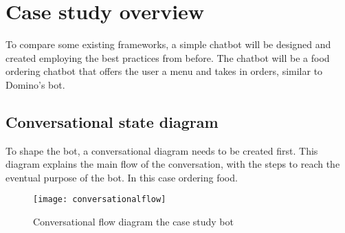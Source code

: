 \chapter{Case study overview}

To compare some existing frameworks, a simple chatbot will be designed and created employing the best practices from before. The chatbot will be a food ordering chatbot that offers the user a menu and takes in orders, similar to Domino's bot.

\section{Conversational state diagram}

To shape the bot, a conversational diagram needs to be created first. This diagram explains the main flow of the conversation, with the steps to reach the eventual purpose of the bot. In this case ordering food.

\begin{figure}[p]
	\centering
	\texttt{[image: conversationalflow]}\label{fig:conversationalflow}
	\caption{Conversational flow diagram the case study bot~}
\end{figure}
